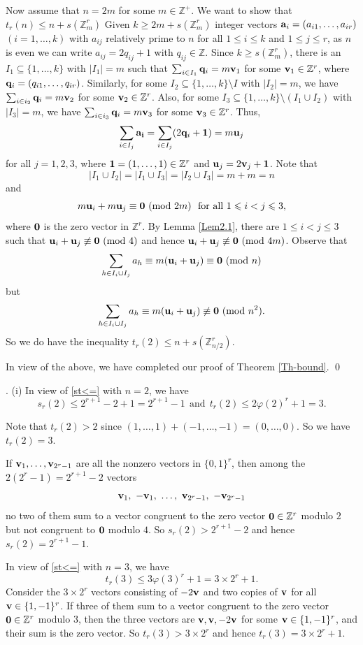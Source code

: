 \documentclass[11pt,reqno]{amsart}
\def\pmod #1{\ ({\rm{mod}}\ #1)}
\def\Z{\mathbb Z}
\def\t{\text}
\def\ls{\leqslant}
\def\gs{\geqslant}
\def\se {\subseteq}
\def\sm{\setminus}
\def\eq{\equiv}
\theoremstyle{plain}
\theoremstyle{definition}
\theoremstyle{remark}
\begin{document}
Now assume that $n=2m$ for some $m\in\Z^+$. We
want to show that  $t_r(n)\ls n+s(\Z_m^r)$
Given $k\gs 2m+s(\Z_m^r)$ integer vectors ${\bf a}_i=(a_{i1},\ldots,a_{ir})$
 $(i=1,\ldots,k)$ with $a_{ij}$ relatively prime to $n$ for all $1\ls i\ls k$ and $1\ls j\ls r$,
 as $n$ is even we can write $a_{ij}=2q_{ij}+1$ with $q_{ij}\in\Z$. Since $k\gs s(\Z_m^r)$,
there is an $I_1\se\{1,\ldots,k\}$ with $|I_1|=m$ such that
$\sum_{i\in I_1}{\bf q}_i=m{\bf v}_1$
for some ${\bf v}_1\in\Z^r$, where ${\bf q}_i=(q_{i1},\ldots,q_{ir})$.
Similarly, for some $I_2\se\{1,\ldots,k\}\sm I$ with $|I_2|=m$, we have
$\sum_{i\in i_2}{\bf q}_i=m{\bf v}_2$
for some ${\bf v}_2\in\Z^r$.
Also, for some $I_3\se\{1,\ldots,k\}\sm(I_1\cup I_2)$ with $|I_3|=m$, we have
$\sum_{i\in i_3}{\bf q}_i=m{\bf v}_3$
for some ${\bf v}_3\in\Z^r$. Thus,
$$\sum_{i\in I_j}{\bf a_i}=\sum_{i\in I_j}(2{\bf q}_i+{\bf 1})=m{\bf u}_j$$
for all $j=1,2,3$, where ${\bf 1}=(1,\ldots,1)\in\Z^r$ and ${\bf u}_j=2{\bf v}_j+{\bf 1}$.
Note that
$$|I_1\cup I_2|=|I_1\cup I_3|=|I_2\cup I_3|=m+m=n$$
and
$$m{\bf u}_i+m{\bf u}_j\eq{\bf 0}\pmod {2m}\ \ \t{for all}\ 1\ls i< j\ls 3,$$
where ${\bf 0}$ is the zero vector in $\Z^r$.
By Lemma \ref{Lem2.1}, there are $1\ls i<j\ls 3$ such that
${\bf u}_i+{\bf u}_j\not\eq{\bf 0}\pmod 4$ and hence
${\bf u}_i+{\bf u}_j\not\eq{\bf 0}\pmod{4m}$.
Observe that
$$\sum_{h\in I_i\cup I_j}a_h\eq m({\bf u}_i+{\bf u}_j)\eq{\bf 0}\pmod{n}$$
but
$$\sum_{h\in I_i\cup I_j}a_h\eq m({\bf u}_i+{\bf u}_j)\not\eq{\bf 0}\pmod{n^2}.$$
So we do have the inequality $t_r(2)\ls n+s(\Z_{n/2}^r)$.

In view of the above, we have completed our proof of Theorem \ref{Th-bound}. \qed

\medskip
{}. (i) In view of \eqref{st<=} with $n=2$, we have
$$s_r(2)\ls 2^{r+1}-2+1=2^{r+1}-1\ \ \t{and}\ \ t_r(2)\ls 2\varphi(2)^r+1=3.$$

Note that $t_r(2)>2$ since $(1,\ldots,1)+(-1,\ldots,-1)=(0,\ldots,0)$. So we have $t_r(2)=3$.

If ${\bf v}_1,\ldots,{\bf v}_{2^r-1}$ are all the nonzero vectors in $\{0,1\}^r$, then among the $2(2^r-1)=2^{r+1}-2$ vectors
$${\bf v}_1,\ -{\bf v}_1,\ \ldots,\ {\bf v}_{2^r-1},\ -{\bf v}_{2^r-1}$$
no two of them sum to a vector congruent to the zero vector ${\bf 0}\in\Z^r$ modulo $2$ but not congruent to ${\bf 0}$ modulo $4$. So $s_r(2)>2^{r+1}-2$ and hence $s_r(2)=2^{r+1}-1$.

 In view of \eqref{st<=} with $n=3$, we have
$$ t_r(3)\ls 3\varphi(3)^r+1=3\times2^r+1.$$
Consider the $3\times 2^r$ vectors consisting of
$-2{\bf v}$ and two copies of ${\bf v}$ for all ${\bf v}\in\{1,-1\}^r$.
If three of them sum to a vector congruent to the zero vector ${\bf 0}\in\Z^r$ modulo $3$, then
the three vectors are ${\bf v},{\bf v},-2{\bf v}$ for some ${\bf v}\in\{1,-1\}^r$, and their sum
is the zero vector. So $t_r(3)>3\times2^r$ and hence $t_r(3)=3\times2^r+1$.
\end{document}

